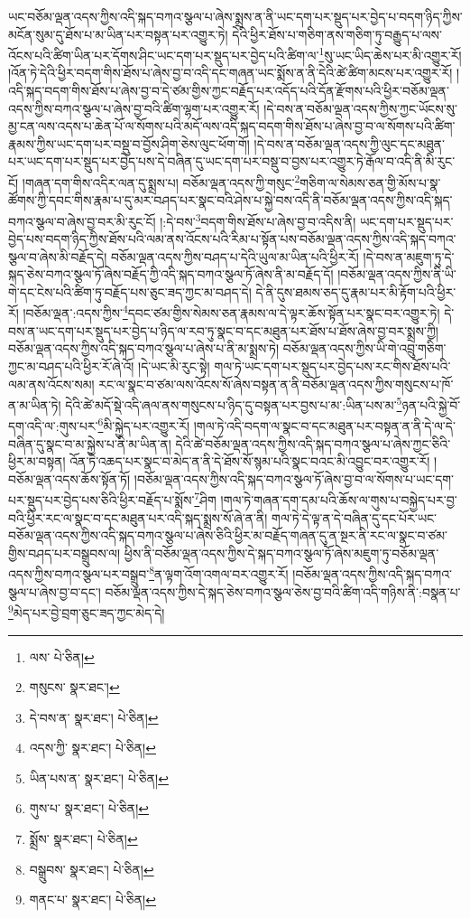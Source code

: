 ཡང་བཅོམ་ལྡན་འདས་ཀྱིས་འདི་སྐད་བཀའ་སྩལ་པ་ཞེས་སྨྲས་ན་ནི་ཡང་དག་པར་སྡུད་པར་བྱེད་པ་བདག་ཉིད་ཀྱིས་མངོན་སུམ་དུ་ཐོས་པ་མ་ཡིན་པར་བསྟན་པར་འགྱུར་ཏེ། དེའི་ཕྱིར་ཐོས་པ་གཅིག་ནས་གཅིག་ཏུ་བརྒྱུད་པ་ལས་འོངས་པའི་ཚིག་ཡིན་པར་དོགས་ཤིང་ཡང་དག་པར་སྡུད་པར་བྱེད་པའི་ཚིག་ལ་\footnote{ལས་  པེ་ཅིན། }སུ་ཡང་ཡིད་ཆེས་པར་མི་འགྱུར་རོ། །འོན་ཏེ་དེའི་ཕྱིར་བདག་གིས་ཐོས་པ་ཞེས་བྱ་བ་འདི་དང་གཞན་ཡང་སྨོས་ན་ནི་དེའི་ཚེ་ཚིག་མངས་པར་འགྱུར་རོ། །འདི་སྐད་བདག་གིས་ཐོས་པ་ཞེས་བྱ་བ་དེ་ཙམ་གྱིས་ཀྱང་བརྗོད་པར་འདོད་པའི་དོན་རྫོགས་པའི་ཕྱིར་བཅོམ་ལྡན་འདས་ཀྱིས་བཀའ་སྩལ་པ་ཞེས་བྱ་བའི་ཚིག་ལྷག་པར་འགྱུར་རོ། །དེ་བས་ན་བཅོམ་ལྡན་འདས་ཀྱིས་ཀྱང་ཡོངས་སུ་མྱ་ངན་ལས་འདས་པ་ཆེན་པོ་ལ་སོགས་པའི་མདོ་ལས་འདི་སྐད་བདག་གིས་ཐོས་པ་ཞེས་བྱ་བ་ལ་སོགས་པའི་ཚིག་རྣམས་ཀྱིས་ཡང་དག་པར་བསྡུ་བ་བྱོས་ཤིག་ཅེས་ལུང་ཕོག་གོ། །དེ་བས་ན་བཅོམ་ལྡན་འདས་ཀྱི་ལུང་དང་མཐུན་པར་ཡང་དག་པར་སྡུད་པར་བྱེད་པས་དེ་བཞིན་དུ་ཡང་དག་པར་བསྡུ་བ་བྱས་པར་འགྱུར་ཏེ་རྒོལ་བ་འདི་ནི་མི་རུང་ངོ། །གཞན་དག་གིས་འདིར་ལན་དུ་སྨྲས་པ། བཅོམ་ལྡན་འདས་ཀྱི་གསུང་\footnote{གསུངས་  སྣར་ཐང་། }གཅིག་ལ་སེམས་ཅན་གྱི་མོས་པ་སྣ་ཚོགས་ཀྱི་དབང་གིས་རྣམ་པ་དུ་མར་བཤད་པར་སྣང་བའི་ཤེས་པ་སྐྱེ་བས་འདི་ནི་བཅོམ་ལྡན་འདས་ཀྱིས་འདི་སྐད་བཀའ་སྩལ་བ་ཞེས་བྱ་བར་མི་རུང་ངོ། །:དེ་བས་\footnote{དེ་བས་ན་  སྣར་ཐང་།  པེ་ཅིན། }བདག་གིས་ཐོས་པ་ཞེས་བྱ་བ་འདིས་ནི། ཡང་དག་པར་སྡུད་པར་བྱེད་པས་བདག་ཉིད་ཀྱིས་ཐོས་པའི་ལམ་ནས་འོངས་པའི་རིམ་པ་སྟོན་པས་བཅོམ་ལྡན་འདས་ཀྱིས་འདི་སྐད་བཀའ་སྩལ་བ་ཞེས་མི་བརྗོད་དེ། བཅོམ་ལྡན་འདས་ཀྱིས་བཤད་པ་དེའི་ཡུལ་མ་ཡིན་པའི་ཕྱིར་རོ། །དེ་བས་ན་མཇུག་ཏུ་དེ་སྐད་ཅེས་བཀའ་སྩལ་ཏོ་ཞེས་བརྗོད་ཀྱི་འདི་སྐད་བཀའ་སྩལ་ཏོ་ཞེས་ནི་མ་བརྗོད་དོ། །བཅོམ་ལྡན་འདས་ཀྱིས་ནི་ཡི་གེ་དང་ངེས་པའི་ཚིག་ཏུ་བརྗོད་པས་ཅུང་ཟད་ཀྱང་མ་བཤད་དེ། དེ་ནི་དུས་ཐམས་ཅད་དུ་རྣམ་པར་མི་རྟོག་པའི་ཕྱིར་རོ། །བཅོམ་ལྡན་:འདས་ཀྱིས་\footnote{འདས་ཀྱི་  སྣར་ཐང་།  པེ་ཅིན། }དབང་ཙམ་གྱིས་སེམས་ཅན་རྣམས་ལ་དེ་ལྟར་ཆོས་སྟོན་པར་སྣང་བར་འགྱུར་ཏེ། དེ་བས་ན་ཡང་དག་པར་སྡུད་པར་བྱེད་པ་ཉིད་ལ་རབ་ཏུ་སྣང་བ་དང་མཐུན་པར་ཐོས་པ་ཐོས་ཞེས་བྱ་བར་སྨྲས་ཀྱི། བཅོམ་ལྡན་འདས་ཀྱིས་འདི་སྐད་བཀའ་སྩལ་པ་ཞེས་པ་ནི་མ་སྨྲས་ཏེ། བཅོམ་ལྡན་འདས་ཀྱིས་ཡི་གེ་འབྲུ་གཅིག་ཀྱང་མ་བཤད་པའི་ཕྱིར་རོ་ཞེ་འོ། །དེ་ཡང་མི་རུང་སྟེ། གལ་ཏེ་ཡང་དག་པར་སྡུད་པར་བྱེད་པས་རང་གིས་ཐོས་པའི་ལམ་ནས་འོངས་སམ། རང་ལ་སྣང་བ་ཙམ་ལས་འོངས་སོ་ཞེས་བསྟན་ན་ནི་བཅོམ་ལྡན་འདས་ཀྱིས་གསུངས་པ་ཁོ་ན་མ་ཡིན་ཏེ། དེའི་ཚེ་མདོ་སྡེ་འདི་ཞལ་ནས་གསུངས་པ་ཉིད་དུ་བསྟན་པར་བྱས་པ་མ་:ཡིན་པས་མ་\footnote{ཡིན་པས་ན་  སྣར་ཐང་།  པེ་ཅིན། }ཉན་པའི་སྐྱེ་བོ་དག་འདི་ལ་:གུས་པར་\footnote{གུས་པ་  སྣར་ཐང་།  པེ་ཅིན། }མི་སྐྱེད་པར་འགྱུར་རོ། །གལ་ཏེ་འདི་བདག་ལ་སྣང་བ་དང་མཐུན་པར་བསྟན་ན་ནི་དེ་ལ་དེ་བཞིན་དུ་སྣང་བ་མ་སྐྱེས་པ་ནི་མ་ཡིན་ན། དེའི་ཚེ་བཅོམ་ལྡན་འདས་ཀྱིས་འདི་སྐད་བཀའ་སྩལ་པ་ཞེས་ཀྱང་ཅིའི་ཕྱིར་མ་བསྟན། འོན་ཏེ་འཆད་པར་སྣང་བ་མེད་ན་ནི་དེ་ཐོས་སོ་སྙམ་པའི་སྣང་བའང་མི་འབྱུང་བར་འགྱུར་རོ། །བཅོམ་ལྡན་འདས་ཆོས་སྟོན་ཏོ། །བཅོམ་ལྡན་འདས་ཀྱིས་འདི་སྐད་བཀའ་སྩལ་ཏོ་ཞེས་བྱ་བ་ལ་སོགས་པ་ཡང་དག་པར་སྡུད་པར་བྱེད་པས་ཅིའི་ཕྱིར་བརྗོད་པ་སྨོས་\footnote{སྨྲོས་  སྣར་ཐང་།  པེ་ཅིན། }ཤིག །གལ་ཏེ་གཞན་དག་དམ་པའི་ཆོས་ལ་གུས་པ་བསྐྱེད་པར་བྱ་བའི་ཕྱིར་རང་ལ་སྣང་བ་དང་མཐུན་པར་འདི་སྐད་སྨྲས་སོ་ཞེ་ན་ནི། གལ་ཏེ་དེ་ལྟ་ན་དེ་བཞིན་དུ་དང་པོར་ཡང་བཅོམ་ལྡན་འདས་ཀྱིས་འདི་སྐད་བཀའ་སྩལ་པ་ཞེས་ཅིའི་ཕྱིར་མ་བརྗོད་གཞན་དུ་ན་སྔར་ནི་རང་ལ་སྣང་བ་ཙམ་གྱིས་བཤད་པར་བསྒྲུབས་ལ། ཕྱིས་ནི་བཅོམ་ལྡན་འདས་ཀྱིས་དེ་སྐད་བཀའ་སྩལ་ཏོ་ཞེས་མཇུག་ཏུ་བཅོམ་ལྡན་འདས་ཀྱིས་བཀའ་སྩལ་པར་བསྒྲུབ་\footnote{བསྒྲུབས་  སྣར་ཐང་།  པེ་ཅིན། }ན་ལྟག་འོག་འགལ་བར་འགྱུར་རོ། །བཅོམ་ལྡན་འདས་ཀྱིས་འདི་སྐད་བཀའ་སྩལ་པ་ཞེས་བྱ་བ་དང་། བཅོམ་ལྡན་འདས་ཀྱིས་དེ་སྐད་ཅེས་བཀའ་སྩལ་ཅེས་བྱ་བའི་ཚིག་འདི་གཉིས་ནི་:བསྣན་པ་\footnote{གནང་པ་  སྣར་ཐང་།  པེ་ཅིན། }མེད་པར་བྱེ་བྲག་ཅུང་ཟད་ཀྱང་མེད་དེ། 